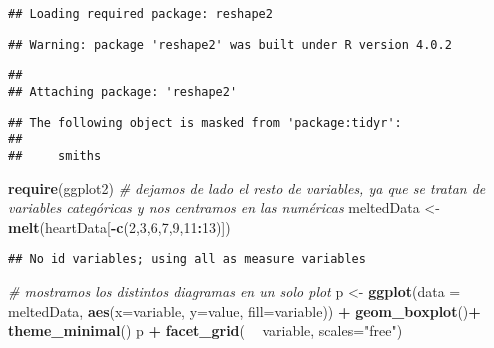 \documentclass[
]{article}
\newenvironment{Shaded}{\begin{snugshade}}{\end{snugshade}}
\newcommand{\CommentTok}[1]{\textcolor[rgb]{0.56,0.35,0.01}{\textit{#1}}}
\newcommand{\DataTypeTok}[1]{\textcolor[rgb]{0.13,0.29,0.53}{#1}}
\newcommand{\DecValTok}[1]{\textcolor[rgb]{0.00,0.00,0.81}{#1}}
\newcommand{\KeywordTok}[1]{\textcolor[rgb]{0.13,0.29,0.53}{\textbf{#1}}}
\newcommand{\NormalTok}[1]{#1}
\newcommand{\OperatorTok}[1]{\textcolor[rgb]{0.81,0.36,0.00}{\textbf{#1}}}
\newcommand{\StringTok}[1]{\textcolor[rgb]{0.31,0.60,0.02}{#1}}
\begin{document}
\begin{verbatim}
## Loading required package: reshape2
\end{verbatim}

\begin{verbatim}
## Warning: package 'reshape2' was built under R version 4.0.2
\end{verbatim}

\begin{verbatim}
## 
## Attaching package: 'reshape2'
\end{verbatim}

\begin{verbatim}
## The following object is masked from 'package:tidyr':
## 
##     smiths
\end{verbatim}

\begin{Shaded}
\begin{Highlighting}[]
\KeywordTok{require}\NormalTok{(ggplot2)}
\CommentTok{# dejamos de lado el resto de variables, ya que se tratan de variables categóricas y nos centramos en las numéricas}
\NormalTok{meltedData <-}\StringTok{ }\KeywordTok{melt}\NormalTok{(heartData[}\OperatorTok{-}\KeywordTok{c}\NormalTok{(}\DecValTok{2}\NormalTok{,}\DecValTok{3}\NormalTok{,}\DecValTok{6}\NormalTok{,}\DecValTok{7}\NormalTok{,}\DecValTok{9}\NormalTok{,}\DecValTok{11}\OperatorTok{:}\DecValTok{13}\NormalTok{)])}
\end{Highlighting}
\end{Shaded}

\begin{verbatim}
## No id variables; using all as measure variables
\end{verbatim}

\begin{Shaded}
\begin{Highlighting}[]
\CommentTok{# mostramos los distintos diagramas en un solo plot}
\NormalTok{p <-}\StringTok{ }\KeywordTok{ggplot}\NormalTok{(}\DataTypeTok{data =}\NormalTok{ meltedData, }\KeywordTok{aes}\NormalTok{(}\DataTypeTok{x=}\NormalTok{variable, }\DataTypeTok{y=}\NormalTok{value, }\DataTypeTok{fill=}\NormalTok{variable)) }\OperatorTok{+}\StringTok{ }
\StringTok{             }\KeywordTok{geom_boxplot}\NormalTok{()}\OperatorTok{+}
\StringTok{             }\KeywordTok{theme_minimal}\NormalTok{()}
\NormalTok{p }\OperatorTok{+}\StringTok{ }\KeywordTok{facet_grid}\NormalTok{( }\OperatorTok{~}\StringTok{ }\NormalTok{variable, }\DataTypeTok{scales=}\StringTok{"free"}\NormalTok{)}
\end{Highlighting}
\end{Shaded}
\end{document}
